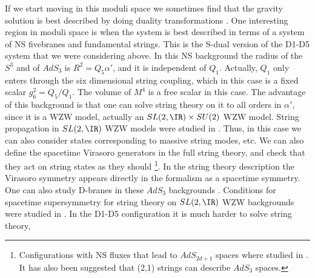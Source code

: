 If we start moving in this moduli space we sometimes find that the
gravity solution 
 is best described by doing duality transformations 
\cite{Dijkgraaf:1998gf,Seiberg:1999xz}. One
interesting region in moduli space is when the system is best described
in terms of a 
 system of NS fivebranes and 
fundamental strings. This is 
the S-dual version of the D1-D5 system that we
were considering above.
In this  NS background the
radius of the $S^3 $ and of $AdS_3$ is $R^2 = Q_5 \alpha'$, and it is 
independent of $Q_1$. Actually, $Q_1$ only enters through the 
six dimensional string coupling, which in this case is a fixed scalar
$g_6^2 = Q_5/Q_1 $. The volume of $M^4$ is a free scalar in this case. 
The advantage of this background is that one can 
solve string theory on it to all orders in $\alpha'$,
 since it is a WZW model, actually 
an $SL(2,\IR)\times SU(2)$ WZW model.
String propagation in  $SL(2,\IR)$ WZW models were studied in 
\cite{Balog:1989jb,Petropoulos:1990fc,Mohammedi:1990dp,%
Bars:1991rb,Hwang:1991aq,%
Henningson:1991ua,Henningson:1991jc,Hwang:1992an,Bars:1996mf,%
Bars:1995cn,Satoh:1997xe,Evans:1998wq,Evans:1998qu,%
Giveon:1998ns,deBoer:1998pp,Kutasov:1999xu,Pesando:1999ex,%
Andreev:1999nt,Andreev:1999uh,Ito:1998vd,Hosomichi:1999be}.
Thus,
in this case we can also consider states corresponding to massive
string modes, etc. We can also define the spacetime Virasoro generators
in the full string theory,
and check that they act on  string states as they should 
\cite{Giveon:1998ns,deBoer:1998pp,Kutasov:1999xu}\footnote{
Configurations with NS fluxes that lead to $AdS_{2d+1}$ spaces
where studied in \cite{deBoer:1999ie}. It has also been suggested 
\cite{O'Loughlin:1998qx} that  (2,1) strings can describe $AdS_3$ 
spaces.}.
In the string theory description the Virasoro symmetry appears
directly in the formalism as a spacetime symmetry. One can also 
study D-branes in these $AdS_3$ backgrounds \cite{Stanciu:1999nx}.
Conditions for spacetime supersymmetry for string theory on $SL(2,\IR)$
WZW backgrounds were studied in \cite{Giveon:1999jg,Berenstein:1999gj}. 
In the D1-D5 configuration it is much harder to solve string theory,
